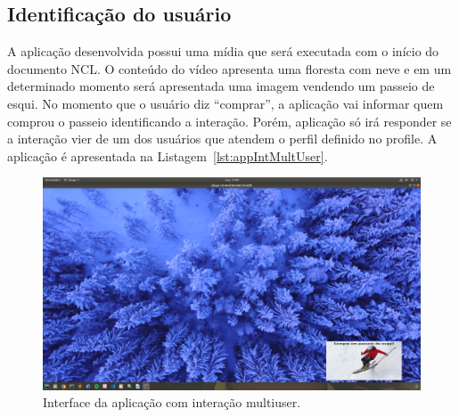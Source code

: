 \subsection{Identificação do usuário} \label{sec:casoUsoIdentificaçãoInteracao}

A aplicação desenvolvida possui uma mídia que será executada com o início do documento NCL. O conteúdo do vídeo apresenta uma floresta com neve e em um determinado momento será apresentada uma imagem vendendo um passeio de esqui. No momento que o usuário diz ``comprar'', a aplicação vai informar quem comprou o passeio identificando a interação. Porém, aplicação só irá responder se a interação vier de um dos usuários que atendem o perfil definido no profile. A aplicação é apresentada na Listagem~\ref{lst:appIntMultUser}.

\begin{figure}[h!] 
    \includegraphics[scale=0.2]{figuras/appMultUser.png}
    \centering
    \caption{Interface da aplicação com interação multiuser.}
    \label{fig:appMultUser}
\end{figure}
\vspace{-0.2cm}

